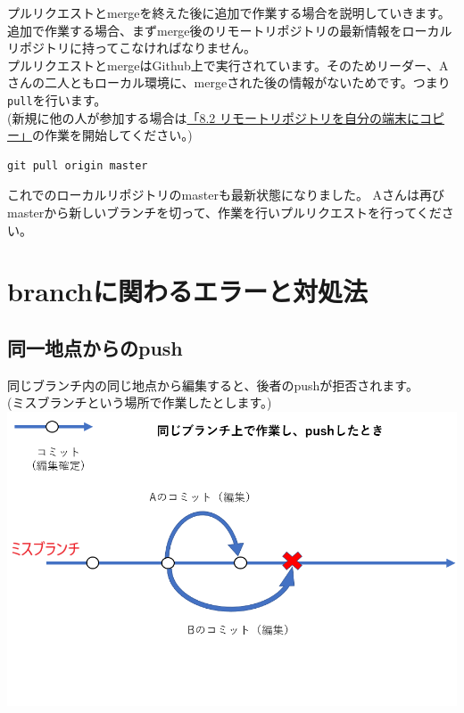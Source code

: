 \documentclass[
]{book}
\begin{document}
プルリクエストとmergeを終えた後に追加で作業する場合を説明していきます。\\
追加で作業する場合、まずmerge後のリモートリポジトリの最新情報をローカルリポジトリに持ってこなければなりません。\\
プルリクエストとmergeはGithub上で実行されています。そのためリーダー、Aさんの二人ともローカル環境に、mergeされた後の情報がないためです。つまり\texttt{pull}を行います。\\
(新規に他の人が参加する場合は\protect\hyperlink{ux30eaux30e2ux30fcux30c8ux30eaux30ddux30b8ux30c8ux30eaux3092ux81eaux5206ux306eux7aefux672bux306bux30b3ux30d4ux30fc}{「8.2 リモートリポジトリを自分の端末にコピー」}の作業を開始してください。)

\begin{verbatim}
git pull origin master   
\end{verbatim}

これでのローカルリポジトリのmasterも最新状態になりました。
Aさんは再びmasterから新しいブランチを切って、作業を行いプルリクエストを行ってください。

\hypertarget{branchux306bux95a2ux308fux308bux30a8ux30e9ux30fcux3068ux5bfeux51e6ux6cd5}{%
\chapter{branchに関わるエラーと対処法}\label{branchux306bux95a2ux308fux308bux30a8ux30e9ux30fcux3068ux5bfeux51e6ux6cd5}}

\hypertarget{ux540cux4e00ux5730ux70b9ux304bux3089ux306epush}{%
\section{同一地点からのpush}\label{ux540cux4e00ux5730ux70b9ux304bux3089ux306epush}}

同じブランチ内の同じ地点から編集すると、後者のpushが拒否されます。\\
(ミスブランチという場所で作業したとします。)
\includegraphics{pics/conflict.png}
\end{document}
